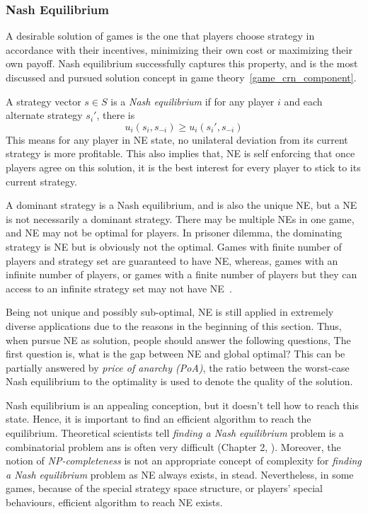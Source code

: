 \subsubsection*{Nash Equilibrium}
A desirable solution of games is the one that players choose strategy in accordance with their incentives, minimizing their own cost or maximizing their own payoff.
Nash equilibrium successfully captures this property, and is the most discussed and pursued solution concept in game theory~\ref{game_crn_component}.

A strategy vector $s\in S$ is a \textit{Nash equilibrium} if for any player $i$ and each alternate strategy $s_i'$, there is
 \[ u_i(s_i, s_{-i}) \geq u_i(s_i', s_{-i})\]
This means for any player in NE state, no unilateral deviation from its current strategy is more profitable.
This also implies that, NE is self enforcing that once players agree on this solution, it is the best interest for every player to stick to its current strategy.

A dominant strategy is a Nash equilibrium, and is also the unique NE, but a NE is not necessarily a dominant strategy.
There may be multiple NEs in one game, and NE may not be optimal for players. 
In prisoner dilemma, the dominating strategy is NE but is obviously not the optimal.
Games with finite number of players and strategy set are guaranteed to have NE, whereas, games with an infinite number of players, or games with a finite number of players but they can access to an infinite strategy set may not have NE~\cite{agt_book}.


Being not unique and possibly sub-optimal, NE is still applied in extremely diverse applications due to the reasons in the beginning of this section.
Thus, when pursue NE as solution, people should answer the following questions,
The first question is, what is the gap between NE and global optimal?
This can be partially answered by \textit{price of anarchy (\gls{PoA})}, the ratio between the worst-case Nash equilibrium to the optimality is used to denote the quality of the solution.

Nash equilibrium is an appealing conception, but it doesn't tell how to reach this state.
Hence, it is important to find an efficient algorithm to reach the equilibrium.
Theoretical scientists tell \textit{finding a Nash equilibrium} problem is a combinatorial problem ans is often very difficult (Chapter 2, \cite{agt_book}).
Moreover, the notion of \textit{NP-completeness} is not an appropriate concept of complexity for \textit{finding a Nash equilibrium} problem as NE always exists, in stead.
Nevertheless, in some games, because of the special strategy space structure, or players' special behaviours, efficient algorithm to reach NE exists.





